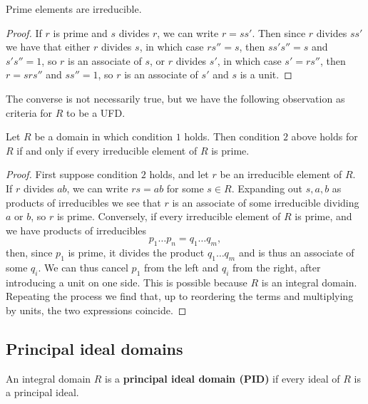 \begin{lemma}
Prime elements are irreducible.
\end{lemma}

\begin{proof}
If $ r $ is prime and $ s $ divides $ r $, we can write $ r = ss' $. Then since $ r $ divides $ ss' $ we have that either $ r $ divides $ s $, in which case $ rs'' = s $, then $ ss's'' = s $ and $ s's'' = 1 $, so $ r $ is an associate of $ s $, or $ r $ divides $ s' $, in which case $ s' = rs'' $, then $ r = srs'' $ and $ ss'' = 1 $, so $ r $ is an associate of $ s' $ and $ s $ is a unit.
\end{proof}

\pagebreak

The converse is not necessarily true, but we have the following observation as criteria for $ R $ to be a UFD.

\begin{proposition}
Let $ R $ be a domain in which condition $ 1 $ holds. Then condition $ 2 $ above holds for $ R $ if and only if every irreducible element of $ R $ is prime.
\end{proposition}

\begin{proof}
First suppose condition $ 2 $ holds, and let $ r $ be an irreducible element of $ R $. If $ r $ divides $ ab $, we can write $ rs = ab $ for some $ s \in R $. Expanding out $ s, a, b $ as products of irreducibles we see that $ r $ is an associate of some irreducible dividing $ a $ or $ b $, so $ r $ is prime. Conversely, if every irreducible element of $ R $ is prime, and we have products of irreducibles
$$ p_1 \dots p_n = q_1 \dots q_m, $$
then, since $ p_1 $ is prime, it divides the product $ q_1 \dots q_m $ and is thus an associate of some $ q_i $. We can thus cancel $ p_1 $ from the left and $ q_i $ from the right, after introducing a unit on one side. This is possible because $ R $ is an integral domain. Repeating the process we find that, up to reordering the terms and multiplying by units, the two expressions coincide.
\end{proof}

\subsection{Principal ideal domains}

\begin{definition}
An integral domain $ R $ is a \textbf{principal ideal domain (PID)} if every ideal of $ R $ is a principal ideal.
\end{definition}

